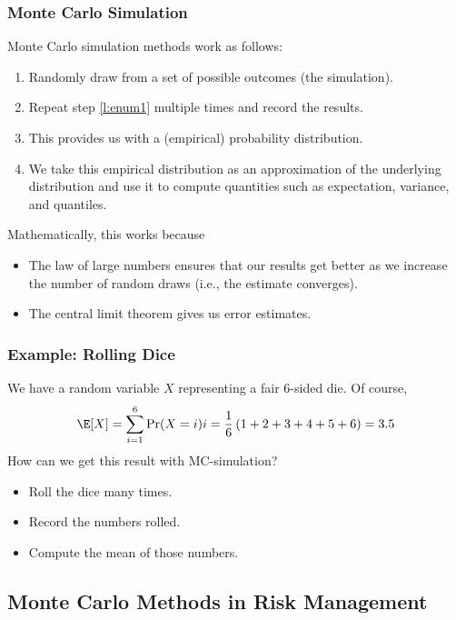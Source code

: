 \begin{frame}[fragile]
\frametitle{Monte Carlo Simulation}
Monte Carlo simulation methods work as follows:
\begin{enumerate}
  \item\label{l:enum1} Randomly draw from a set of possible outcomes (the
  simulation).
  \item Repeat step \ref{l:enum1} multiple times and record the results.
  \item This provides us with a (empirical) probability distribution.
  \item We take this empirical distribution as an approximation of the
  underlying distribution and use it to compute quantities such as
  expectation, variance, and quantiles.
\end{enumerate}
Mathematically, this works because
\begin{itemize}
  \item The law of large numbers ensures that our results get better as we
  	increase the number of random draws (i.e., the estimate converges).
  \item The central limit theorem gives us error estimates.
\end{itemize}
\end{frame}


\begin{frame}[fragile]
\frametitle{Example: Rolling Dice}
We have a random variable $X$ representing a fair 6-sided die. Of course,
\begin{align*}
  \E[X] = \sum_{i=1}^6 \Pr(X=i)i=\frac{1}{6}\left( 1 + 2 + 3 + 4 + 5 + 6
  \right)= 3.5
\end{align*}
How can we get this result with MC-simulation?
\begin{itemize}
  \item Roll the dice many times.
  \item Record the numbers rolled.
  \item Compute the mean of those numbers.
\end{itemize}
\end{frame}

\subsection{Monte Carlo Methods in Risk Management}
